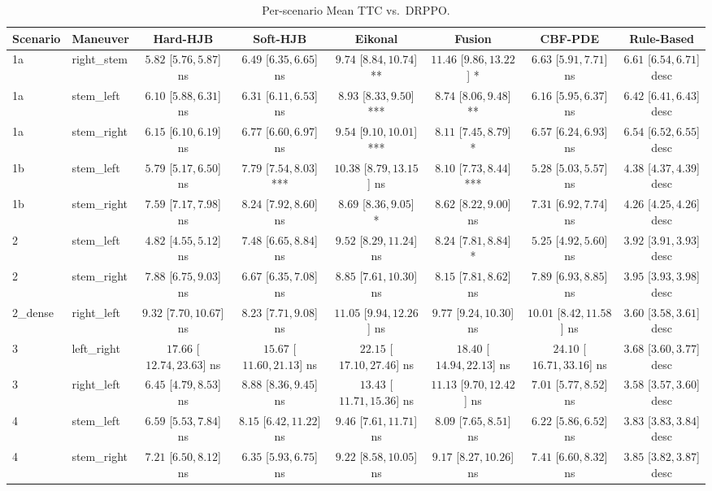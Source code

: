 \begin{table}[ht]
\centering
\caption{Per-scenario Mean TTC vs.\ DRPPO.}
\label{tab:per_scenario_mean_ttc}
\begin{tabular}{llcccccc}
\toprule
Scenario & Maneuver & Hard-HJB & Soft-HJB & Eikonal & Fusion & CBF-PDE & Rule-Based \\
\midrule
1a & right_stem & $5.82$ [$5.76, 5.87$] ns & $6.49$ [$6.35, 6.65$] ns & $9.74$ [$8.84, 10.74$] ** & $11.46$ [$9.86, 13.22$] * & $6.63$ [$5.91, 7.71$] ns & $6.61$ [$6.54, 6.71$] desc \\
1a & stem_left & $6.10$ [$5.88, 6.31$] ns & $6.31$ [$6.11, 6.53$] ns & $8.93$ [$8.33, 9.50$] *** & $8.74$ [$8.06, 9.48$] ** & $6.16$ [$5.95, 6.37$] ns & $6.42$ [$6.41, 6.43$] desc \\
1a & stem_right & $6.15$ [$6.10, 6.19$] ns & $6.77$ [$6.60, 6.97$] ns & $9.54$ [$9.10, 10.01$] *** & $8.11$ [$7.45, 8.79$] * & $6.57$ [$6.24, 6.93$] ns & $6.54$ [$6.52, 6.55$] desc \\
1b & stem_left & $5.79$ [$5.17, 6.50$] ns & $7.79$ [$7.54, 8.03$] *** & $10.38$ [$8.79, 13.15$] ns & $8.10$ [$7.73, 8.44$] *** & $5.28$ [$5.03, 5.57$] ns & $4.38$ [$4.37, 4.39$] desc \\
1b & stem_right & $7.59$ [$7.17, 7.98$] ns & $8.24$ [$7.92, 8.60$] ns & $8.69$ [$8.36, 9.05$] * & $8.62$ [$8.22, 9.00$] ns & $7.31$ [$6.92, 7.74$] ns & $4.26$ [$4.25, 4.26$] desc \\
2 & stem_left & $4.82$ [$4.55, 5.12$] ns & $7.48$ [$6.65, 8.84$] ns & $9.52$ [$8.29, 11.24$] ns & $8.24$ [$7.81, 8.84$] * & $5.25$ [$4.92, 5.60$] ns & $3.92$ [$3.91, 3.93$] desc \\
2 & stem_right & $7.88$ [$6.75, 9.03$] ns & $6.67$ [$6.35, 7.08$] ns & $8.85$ [$7.61, 10.30$] ns & $8.15$ [$7.81, 8.62$] ns & $7.89$ [$6.93, 8.85$] ns & $3.95$ [$3.93, 3.98$] desc \\
2_dense & right_left & $9.32$ [$7.70, 10.67$] ns & $8.23$ [$7.71, 9.08$] ns & $11.05$ [$9.94, 12.26$] ns & $9.77$ [$9.24, 10.30$] ns & $10.01$ [$8.42, 11.58$] ns & $3.60$ [$3.58, 3.61$] desc \\
3 & left_right & $17.66$ [$12.74, 23.63$] ns & $15.67$ [$11.60, 21.13$] ns & $22.15$ [$17.10, 27.46$] ns & $18.40$ [$14.94, 22.13$] ns & $24.10$ [$16.71, 33.16$] ns & $3.68$ [$3.60, 3.77$] desc \\
3 & right_left & $6.45$ [$4.79, 8.53$] ns & $8.88$ [$8.36, 9.45$] ns & $13.43$ [$11.71, 15.36$] ns & $11.13$ [$9.70, 12.42$] ns & $7.01$ [$5.77, 8.52$] ns & $3.58$ [$3.57, 3.60$] desc \\
4 & stem_left & $6.59$ [$5.53, 7.84$] ns & $8.15$ [$6.42, 11.22$] ns & $9.46$ [$7.61, 11.71$] ns & $8.09$ [$7.65, 8.51$] ns & $6.22$ [$5.86, 6.52$] ns & $3.83$ [$3.83, 3.84$] desc \\
4 & stem_right & $7.21$ [$6.50, 8.12$] ns & $6.35$ [$5.93, 6.75$] ns & $9.22$ [$8.58, 10.05$] ns & $9.17$ [$8.27, 10.26$] ns & $7.41$ [$6.60, 8.32$] ns & $3.85$ [$3.82, 3.87$] desc \\
\bottomrule
\end{tabular}
\end{table}
